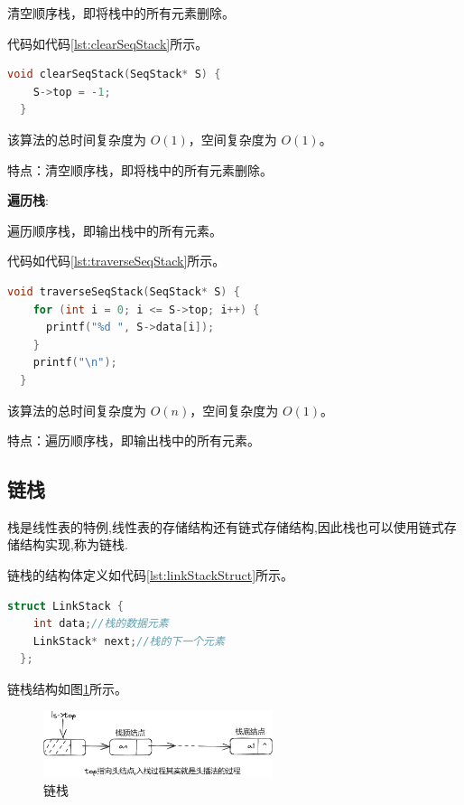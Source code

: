 \documentclass[lang=cn,newtx,10pt,scheme=chinese]{../elegantbook}
\begin{document}
清空顺序栈，即将栈中的所有元素删除。

代码如代码\ref{lst:clearSeqStack}所示。

\begin{lstlisting}[language=C++, caption={清空顺序栈示例代码}, label={lst:clearSeqStack}]
  void clearSeqStack(SeqStack* S) {
    S->top = -1;
  }

\end{lstlisting}

该算法的总时间复杂度为 $O(1)$，空间复杂度为 $O(1)$。

特点：清空顺序栈，即将栈中的所有元素删除。

\textbf{遍历栈}:

遍历顺序栈，即输出栈中的所有元素。

代码如代码\ref{lst:traverseSeqStack}所示。

\begin{lstlisting}[language=C++, caption={遍历顺序栈示例代码}, label={lst:traverseSeqStack}]
  void traverseSeqStack(SeqStack* S) {
    for (int i = 0; i <= S->top; i++) {
      printf("%d ", S->data[i]);
    }
    printf("\n");
  }

\end{lstlisting}

该算法的总时间复杂度为 $O(n)$，空间复杂度为 $O(1)$。

特点：遍历顺序栈，即输出栈中的所有元素。




\subsection{链栈}

栈是线性表的特例,线性表的存储结构还有链式存储结构,因此栈也可以使用链式存储结构实现,称为链栈.

链栈的结构体定义如代码\ref{lst:linkStackStruct}所示。

\begin{lstlisting}[language=C++, caption={链栈结构体定义}, label={lst:linkStackStruct}]
  struct LinkStack {
    int data;//栈的数据元素
    LinkStack* next;//栈的下一个元素
  };
\end{lstlisting}

链栈结构如图\ref{fig:linkStack}所示。

\begin{figure}[!htbp]
  \centering
  \includegraphics[width=0.6\textwidth]{./figure/pdf/cropped/linkStack.pdf}
  \caption{链栈}
  \label{fig:linkStack}
\end{figure}
\end{document}

